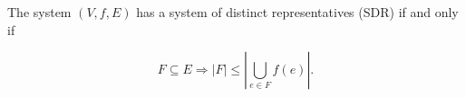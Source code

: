 The system $(V, f, E)$ has a system of distinct representatives (SDR) if and only if

$$F \subseteq E \Rightarrow |F| \leq \left| \bigcup_{e \in F} f(e) \right|.$$
